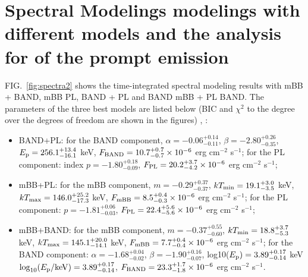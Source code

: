 \documentclass[prd,twocolumn,amsmath,amssymb,aps,linenumbers]{revtex4-2} %
\providecommand{\DIFaddtex}[1]{{\protect\color{blue} \sf #1}} %
\providecommand{\DIFdeltex}[1]{{\protect\color{red} \scriptsize #1}} %
\providecommand{\DIFaddbegin}{} %
\providecommand{\DIFaddend}{} %
\providecommand{\DIFdelbegin}{} %
\providecommand{\DIFdelend}{} %
\providecommand{\DIFadd}[1]{\texorpdfstring{\DIFaddtex{#1}}{#1}} %
\providecommand{\DIFdel}[1]{\texorpdfstring{\DIFdeltex{#1}}{}} %
\newcommand{\DIFscaledelfig}{0.5}
\newlength{\DIFdelgraphicswidth} %
\newlength{\DIFdelgraphicsheight} %
\newcommand{\DIFaddincludegraphics}[2][]{{\color{blue}\fbox{\DIFOincludegraphics[#1]{#2}}}} %
\newcommand{\DIFdelincludegraphics}[2][]{%
\sbox{\DIFdelgraphicsbox}{\DIFOincludegraphics[#1]{#2}}%
\settoboxwidth{\DIFdelgraphicswidth}{\DIFdelgraphicsbox} %
\settoboxtotalheight{\DIFdelgraphicsheight}{\DIFdelgraphicsbox} %
\scalebox{\DIFscaledelfig}{%
\parbox[b]{\DIFdelgraphicswidth}{\usebox{\DIFdelgraphicsbox}\\[-\baselineskip] \rule{\DIFdelgraphicswidth}{0em}}\llap{\resizebox{\DIFdelgraphicswidth}{\DIFdelgraphicsheight}{%
\setlength{\unitlength}{\DIFdelgraphicswidth}%
\begin{picture}(1,1)%
\thicklines\linethickness{2pt} %
{\color[rgb]{1,0,0}\put(0,0){\framebox(1,1){}}}%
{\color[rgb]{1,0,0}\put(0,0){\line( 1,1){1}}}%
{\color[rgb]{1,0,0}\put(0,1){\line(1,-1){1}}}%
\end{picture}%
}\hspace*{3pt}}} %
} %
\DeclareRobustCommand{\DIFaddbegin}{\DIFOaddbegin \let\includegraphics\DIFaddincludegraphics} %
\DeclareRobustCommand{\DIFaddend}{\DIFOaddend \let\includegraphics\DIFOincludegraphics} %
\DeclareRobustCommand{\DIFdelbegin}{\DIFOdelbegin \let\includegraphics\DIFdelincludegraphics} %
\DeclareRobustCommand{\DIFdelend}{\DIFOaddend \let\includegraphics\DIFOincludegraphics} %
\begin{document}
\section{Spectral \DIFdelbegin \DIFdel{Modelings }\DIFdelend \DIFaddbegin \DIFadd{modelings }\DIFaddend with different models and the analysis \DIFdelbegin \DIFdel{for }\DIFdelend \DIFaddbegin \DIFadd{of }\DIFaddend the prompt emission}\label{sec:spectra2}
FIG.~\ref{fig:spectra2} shows the time-integrated spectral modeling results with mBB + \DIFdelbegin \DIFdel{BAND, mBB }\DIFdelend \DIFaddbegin \DIFadd{PL, BAND }\DIFaddend + PL and \DIFdelbegin \DIFdel{BAND }\DIFdelend \DIFaddbegin \DIFadd{mBB }\DIFaddend + \DIFdelbegin \DIFdel{PL}\DIFdelend \DIFaddbegin \DIFadd{BAND}\DIFaddend .
The parameters of the three best models are listed below (BIC and $\chi^2$ \DIFdelbegin \DIFdel{to the degree }\DIFdelend \DIFaddbegin \DIFadd{over the degrees }\DIFaddend of freedom are shown in the figures)\DIFdelbegin \DIFdel{,
}\DIFdelend \DIFaddbegin \DIFadd{:
}\DIFaddend \begin{itemize}
    \item BAND+PL: for the BAND component, $\alpha=-0.06^{+0.14}_{-0.11}$, $\beta=-2.80^{+0.26}_{-0.35}$, $E_{\rm p}=256.1^{+13.4}_{-16.1}$ keV, $F_{\rm BAND}=10.7^{+0.7}_{-0.7}\times10^{-6}$ erg cm$^{-2}$ s$^{-1}$; for the PL component: index $p=-1.80^{+0.18}_{-0.09}$, $F_{\rm PL}=20.2^{+3.7}_{-4.2}\times10^{-6}$ erg cm$^{-2}$ s$^{-1}$; 
    \item mBB+PL: for the mBB component, $m=-0.29^{+0.37}_{-0.37}$, $kT_{\rm min}=19.1^{+3.0}_{-3.5}$ keV, $kT_{\rm max}=146.0^{+25.2}_{-17.3}$ keV, $F_{\rm mBB}=8.5^{+0.4}_{-0.3}\times10^{-6}$ erg cm$^{-2}$ s$^{-1}$; for the PL component: $p=-1.81^{+0.06}_{-0.03}$, $F_{\rm PL}=22.4^{+5.6}_{-5.6}\times10^{-6}$ erg cm$^{-2}$ s$^{-1}$; 
    \item mBB+BAND: for the mBB component, $m=-0.37^{+0.55}_{-0.60}$, $kT_{\rm min}=18.8^{+3.7}_{-5.3}$ keV, $kT_{\rm max}=145.1^{+20.0}_{-14.1}$ keV, $F_{\rm mBB}=7.7^{+0.4}_{-0.4}\times10^{-6}$ erg cm$^{-2}$ s$^{-1}$; 
    for the BAND component: $\alpha=-1.68^{+0.04}_{-0.02}$, $\beta=-1.90^{+0.16}_{-0.07}$, \DIFdelbegin \DIFdel{log10($E_{\rm p})=3.89^{+0.17}_{-0.14}$ keV}\DIFdelend \DIFaddbegin \DIFadd{$\log_{10}(E_{\rm p}/{\rm keV})=3.89^{+0.17}_{-0.14}$}\DIFaddend , $F_{\rm BAND}=23.3^{+1.7}_{-1.8}\times10^{-6}$ erg cm$^{-2}$ s$^{-1}$.
\end{itemize}
\end{document}
